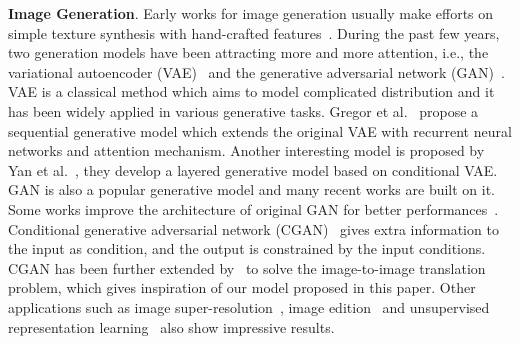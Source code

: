\documentclass[journal]{IEEEtran}
\begin{document}
\textbf{Image Generation}. Early works for image generation usually make efforts on simple texture synthesis with hand-crafted features~\cite{portilla2000parametric}.
During the past few years, two generation models have been attracting more and more attention, i.e., the variational autoencoder (VAE)~\cite{DBLP:journals/corr/KingmaW13} and the generative adversarial network (GAN)~\cite{goodfellow2014generative}.
VAE is a classical method which aims to model complicated distribution and it has been widely applied in various generative tasks. Gregor et al.~\cite{gregor2015draw} propose a sequential generative model which extends the original VAE with recurrent neural networks and attention mechanism. Another interesting model is proposed by Yan et al.~\cite{yan2016attribute2image}, they develop a layered generative model based on conditional VAE.
GAN is also a popular generative model and many recent works are built on it. Some works improve the architecture of original GAN for better performances~\cite{zhao2016energy,chen2016infogan,qi2017loss,arjovsky2017wasserstein}. Conditional generative adversarial network (CGAN)~\cite{mirza2014conditional} gives extra information to the input as condition, and the output is constrained by the input conditions. CGAN has been further extended by~\cite{DBLP:journals/corr/IsolaZZE16,zhu2017unpaired,pmlr-v70-kim17a} to solve the image-to-image translation problem, which gives inspiration of our model proposed in this paper. Other applications such as image super-resolution~\cite{ledig2016photo}, image edition~\cite{brock2016neural} and unsupervised representation learning~\cite{radford2015unsupervised} also show impressive results.
\end{document}
